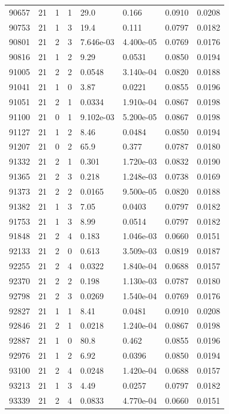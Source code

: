 \documentclass[preview]{standalone}
\begin{document}
{{{{{{{{{\begin{tabular}{L{1.2cm}C{1.2cm} C{0.3cm}C{0.5cm} C{1.4cm}C{1.4cm} C{1.4cm}C{1.4cm}}
  90657  &    21  & 1     &  1 &  29.0  & 0.166  & 0.0910 &  0.0208   \\ 
  90753  &    21  & 1     &  3 &  19.4  & 0.111  & 0.0797 &  0.0182   \\ 
  90801  &    21  & 2     &  3 &  7.646e-03  & 4.400e-05  & 0.0769 &  0.0176   \\ 
  90816  &    21  & 1     &  2 &  9.29  & 0.0531  & 0.0850 &  0.0194   \\ 
  91005  &    21  & 2     &  2 &  0.0548  & 3.140e-04  & 0.0820 &  0.0188   \\ 
  91041  &    21  & 1     &  0 &  3.87  & 0.0221  & 0.0855 &  0.0196   \\ 
  91051  &    21  & 2     &  1 &  0.0334  & 1.910e-04  & 0.0867 &  0.0198   \\ 
  91100  &    21  & 0     &  1 &  9.102e-03  & 5.200e-05  & 0.0867 &  0.0198   \\ 
  91127  &    21  & 1     &  2 &  8.46  & 0.0484  & 0.0850 &  0.0194   \\ 
  91207  &    21  & 0     &  2 &  65.9  & 0.377  & 0.0787 &  0.0180   \\ 
  91332  &    21  & 2     &  1 &  0.301  & 1.720e-03  & 0.0832 &  0.0190   \\ 
  91365  &    21  & 2     &  3 &  0.218  & 1.248e-03  & 0.0738 &  0.0169   \\ 
  91373  &    21  & 2     &  2 &  0.0165  & 9.500e-05  & 0.0820 &  0.0188   \\ 
  91382  &    21  & 1     &  3 &  7.05  & 0.0403  & 0.0797 &  0.0182   \\ 
  91753  &    21  & 1     &  3 &  8.99  & 0.0514  & 0.0797 &  0.0182   \\ 
  91848  &    21  & 2     &  4 &  0.183  & 1.046e-03  & 0.0660 &  0.0151   \\ 
  92133  &    21  & 2     &  0 &  0.613  & 3.509e-03  & 0.0819 &  0.0187   \\ 
  92255  &    21  & 2     &  4 &  0.0322  & 1.840e-04  & 0.0688 &  0.0157   \\ 
  92370  &    21  & 2     &  2 &  0.198  & 1.130e-03  & 0.0787 &  0.0180   \\ 
  92798  &    21  & 2     &  3 &  0.0269  & 1.540e-04  & 0.0769 &  0.0176   \\ 
  92827  &    21  & 1     &  1 &  8.41  & 0.0481  & 0.0910 &  0.0208   \\ 
  92846  &    21  & 2     &  1 &  0.0218  & 1.240e-04  & 0.0867 &  0.0198   \\ 
  92887  &    21  & 1     &  0 &  80.8  & 0.462  & 0.0855 &  0.0196   \\ 
  92976  &    21  & 1     &  2 &  6.92  & 0.0396  & 0.0850 &  0.0194   \\ 
  93100  &    21  & 2     &  4 &  0.0248  & 1.420e-04  & 0.0688 &  0.0157   \\ 
  93213  &    21  & 1     &  3 &  4.49  & 0.0257  & 0.0797 &  0.0182   \\ 
  93339  &    21  & 2     &  4 &  0.0833  & 4.770e-04  & 0.0660 &  0.0151   \\ 
\hline 
\end{tabular} 

}}}}}}}}}
\end{document}
